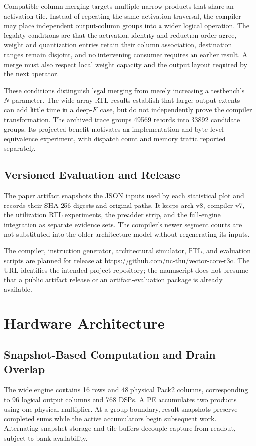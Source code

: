 \documentclass[10pt,conference,letterpaper]{IEEEtran}
\begin{document}
Compatible-column merging targets multiple narrow products that share an activation tile. Instead of repeating the same activation traversal, the compiler may place independent output-column groups into a wider logical operation. The legality conditions are that the activation identity and reduction order agree, weight and quantization entries retain their column association, destination ranges remain disjoint, and no intervening consumer requires an earlier result. A merge must also respect local weight capacity and the output layout required by the next operator.

These conditions distinguish legal merging from merely increasing a testbench's $N$ parameter. The wide-array RTL results establish that larger output extents can add little time in a deep-$K$ case, but do not independently prove the compiler transformation. The archived trace groups 49569 records into 33892 candidate groups. Its projected benefit motivates an implementation and byte-level equivalence experiment, with dispatch count and memory traffic reported separately.

\subsection{Versioned Evaluation and Release}
The paper artifact snapshots the JSON inputs used by each statistical plot and records their SHA-256 digests and original paths. It keeps arch v8, compiler v7, the utilization RTL experiments, the preadder strip, and the full-engine integration as separate evidence sets. The compiler's newer segment counts are not substituted into the older architecture model without regenerating its inputs.

The compiler, instruction generator, architectural simulator, RTL, and evaluation scripts are planned for release at \url{https://github.com/nc-thu/vector-core-r3c}. The URL identifies the intended project repository; the manuscript does not presume that a public artifact release or an artifact-evaluation package is already available.


\section{Hardware Architecture}
\subsection{Snapshot-Based Computation and Drain Overlap}
The wide engine contains 16 rows and 48 physical Pack2 columns, corresponding to 96 logical output columns and 768 DSPs. A PE accumulates two products using one physical multiplier. At a group boundary, result snapshots preserve completed sums while the active accumulators begin subsequent work. Alternating snapshot storage and tile buffers decouple capture from readout, subject to bank availability.
\end{document}
